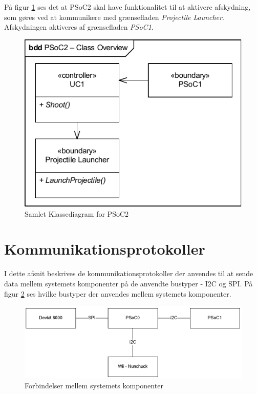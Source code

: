 På figur \ref{fig:CompleteClassDiagramPSoC2} ses det at PSoC2 skal have funktionalitet til at aktivere afskydning, som gøres ved at kommunikere med grænsefladen \textit{Projectile Launcher}. Afskydningen aktiveres af grænsefladen \textit{PSoC1}.
\begin{figure}[H]
	\centering
	\includegraphics[width=\textwidth] {Systemarkitektur/images/CompleteClassDiagramPSoC2}
	\caption{Samlet Klassediagram for PSoC2}
	\label{fig:CompleteClassDiagramPSoC2}
\end{figure}

\section{Kommunikationsprotokoller}
\label{afsnit:kommunikationsprotokoller}
I dette afsnit beskrives de kommunikationsprotokoller der anvendes til at sende data mellem systemets komponenter på de anvendte bustyper - I2C og SPI. På figur \ref{fig:kommunikationsOverblik} ses hvilke bustyper der anvendes mellem systemets komponenter. 

\begin{figure}[H]
	\centering
	\includegraphics[width=\textwidth] {Systemarkitektur/images/anvendtebustyper}
	\caption{Forbindelser mellem systemets komponenter}
	\label{fig:kommunikationsOverblik}
\end{figure}

